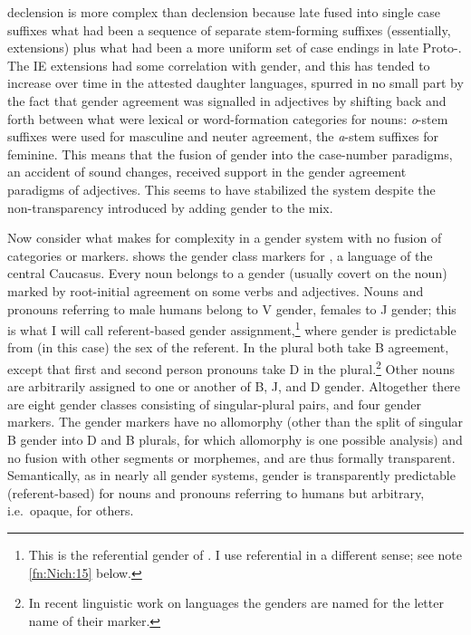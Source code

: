\documentclass[output=collectionpaper]{langsci/langscibook}
\begin{document}
 declension is more complex than  declension because late  fused into single case suffixes what had been a sequence of separate stem-forming suffixes (essentially, extensions) plus what had been a more uniform set of case endings in late Proto-. The IE extensions had some correlation with gender, and this has tended to increase over time in the attested daughter languages, spurred in no small part by the fact that gender agreement was signalled in adjectives by shifting back and forth between what were lexical or word-formation categories for nouns: \textit{o}-stem suffixes were used for masculine and neuter agreement, the \textit{a}-stem suffixes for feminine. This means that the fusion of gender into the case-number paradigms, an accident of  sound changes, received support in the gender agreement paradigms of adjectives. This seems to have stabilized the system despite the non-transparency introduced by adding gender to the mix.

Now consider what makes for complexity in a gender system with no fusion of categories or markers.  shows the gender class markers for , a  language of the central Caucasus. Every noun belongs to a gender (usually covert on the noun) marked by root-initial agreement on some verbs and adjectives. Nouns and pronouns referring to male humans belong to V gender, females to J gender; this is what I will call referent-based gender assignment,\footnote{%
This is the referential gender of \citet{Dahl2000a}.  I use referential in a different sense; see note \ref{fn:Nich:15} below.
} %
where gender is predictable from (in this case) the sex of the referent.  In the plural both take B agreement, except that first and second person pronouns take D in the plural.\footnote{%
In recent linguistic work on  languages the genders are named for the letter name of their marker.
} %
Other nouns are arbitrarily assigned to one or another of B, J, and D gender. Altogether there are eight gender classes consisting of singular-plural pairs, and four gender markers. The gender markers have no allomorphy (other than the split of singular B gender into D and B plurals, for which allomorphy is one possible analysis) and no fusion with other segments or morphemes, and are thus formally transparent. Semantically, as in nearly all gender systems, gender is transparently predictable (referent-based) for nouns and pronouns referring to humans but arbitrary, i.e.\ opaque, for others.
\end{document}
